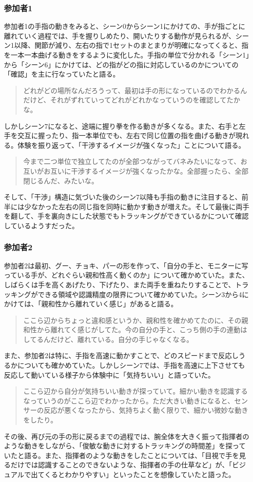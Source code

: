 \subsubsection*{参加者1}
参加者1の手指の動きをみると、シーン0からシーン1にかけての、手が指ごとに離れていく過程では、手を握りしめたり、開いたりする動作が見られるが、シーン1以降、関節が減り、左右の指で1セットのまとまりが明確になってくると、指を一本一本曲げる動きをするように変化した。手指の単位で分かれる「シーン1」から「シーン6」にかけては、どの指がどの指に対応しているのかについての「確認」を主に行なっていたと語る。
\begin{quote}
  どれがどの場所なんだろうって、最初は手の形になっているのでわかるんだけど、それがずれていってどれがどれかなっていうのを確認してたかな。
\end{quote}
しかしシーン7になると、途端に握り拳を作る動きが多くなる。また、右手と左手を交互に握ったり、指一本単位でも、左右で同じ位置の指を曲げる動きが現れる。体験を振り返って、「干渉するイメージが強くなった」ことについて語る。
\begin{quote}
  今まで二つ単位で独立してたのが全部つながってバネみたいになって、お互いがお互いに干渉するイメージが強くなったかな。全部握ったら、全部閉じるんだ、みたいな。
\end{quote}
そして、「干渉」構造に気づいた後のシーン7以降も手指の動きに注目すると、前半には少なかった左右の同じ指を同時に動かす動きが増えた。そして最後に両手を翻して、手を裏向きにした状態でもトラッキングができているかについて確認しているようすだった。\\
\subsubsection*{参加者2}
参加者2は最初、グー、チョキ、パーの形を作って、「自分の手と、モニターに写っている手が、どれぐらい親和性高く動くのか」について確かめていた。また、しばらくは手を高くあげたり、下げたり、また両手を重ねたりすることで、トラッキングができる領域や認識精度の限界について確かめていた。シーン3から4にかけては、「親和性から離れていく感じ」があると語る。
\begin{quote}
  ここら辺からちょっと違和感というか、親和性を確かめてたのに、その親和性から離れてく感じがしてた。今の自分の手と、こっち側の手の連動はしてるんだけど、離れている。自分の手じゃなくなる。
\end{quote}
また、参加者2は特に、手指を高速に動かすことで、どのスピードまで反応しうるかについても確かめていた。しかしシーン7では、手指を高速に上下させても反応して動いている様子から体験中に「気持ちいい」と語っていた。
\begin{quote}
  ここら辺から自分が気持ちいい動きが探っていて。細かい動きを認識するなっていうのがここら辺でわかったから。ただ大きい動きになると、センサーの反応が悪くなったから、気持ちよく動く限りで、細かい微妙な動きをしたり。
\end{quote}
その後、再び元の手の形に戻るまでの過程では、腕全体を大きく振って指揮者のような動きをしながら、「俊敏な動きに対するトラッキングの時間差」を探っていたと語る。また、指揮者のような動きをしたことについては、「目視で手を見るだけでは認識することのできないような、指揮者の手の仕草など」が、「ビジュアルで出てくるとわかりやすい」といったことを想像していたと語った。

